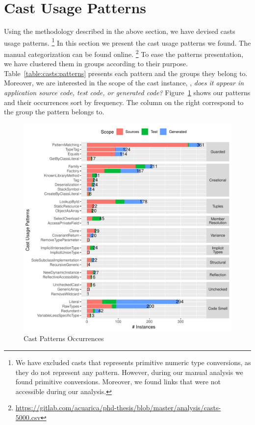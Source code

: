 \section{Cast Usage Patterns}
\label{sec:casts:patterns}

Using the methodology described in the above section, we have devised \npattern{} casts usage patterns.%
\footnote{We have excluded casts that represents primitive numeric type conversions, as they do not represent any pattern.
However, during our manual analysis we found \nprim{} primitive conversions.
Moreover, we found \nbrokenlinks{} links that were not accessible during our analysis.}
In this section we present the cast usage patterns we found.
The manual categorization can be found online.%
\footnote{\url{https://gitlab.com/acuarica/phd-thesis/blob/master/analysis/casts-5000.csv}}
To ease the patterns presentation, we have clustered them in \ngroup{} groups according to their purpose.
Table~\ref{table:casts:patterns} presents each pattern and the groups they belong to.
Moreover, we are interested in the scope of the cast instance, \ie, \emph{does it appear in application source code, test code, or generated code?}
Figure~\ref{fig:patterns} shows our patterns and their occurrences sort by frequency.
The column on the right correspond to the group the pattern belongs to.



\begin{figure}[ht!]
\centering
\includegraphics[width=\textwidth]{analysis/table-patterns-5000.pdf}
\caption{Cast Patterns Occurrences} \label{fig:patterns}
\end{figure}

